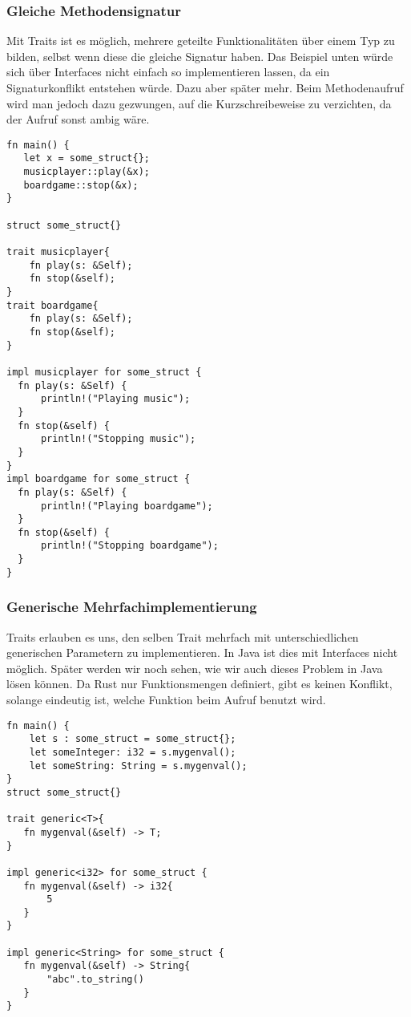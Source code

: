 \documentclass[a4paper, 1ppt]{article}
\begin{document}
\subsubsection{Gleiche Methodensignatur}
Mit Traits ist es möglich, mehrere geteilte Funktionalitäten über einem Typ zu bilden, selbst wenn diese die gleiche Signatur haben.
Das Beispiel unten würde sich über Interfaces nicht einfach so implementieren lassen, da ein Signaturkonflikt entstehen würde. Dazu aber später mehr.
Beim Methodenaufruf wird man jedoch dazu gezwungen, auf die Kurzschreibeweise zu verzichten, da der Aufruf sonst ambig wäre.
\begin{verbatim}
fn main() {
   let x = some_struct{};
   musicplayer::play(&x);
   boardgame::stop(&x);
}

struct some_struct{}

trait musicplayer{
    fn play(s: &Self);
    fn stop(&self);
}
trait boardgame{
    fn play(s: &Self);
    fn stop(&self);
}

impl musicplayer for some_struct {
  fn play(s: &Self) {
      println!("Playing music");
  }
  fn stop(&self) {
      println!("Stopping music");
  }
}
impl boardgame for some_struct {
  fn play(s: &Self) {
      println!("Playing boardgame");
  }
  fn stop(&self) {
      println!("Stopping boardgame");
  }
}
\end{verbatim}
\subsubsection{Generische Mehrfachimplementierung}
Traits erlauben es uns, den selben Trait mehrfach mit unterschiedlichen generischen Parametern zu implementieren.
In Java ist dies mit Interfaces nicht möglich. Später werden wir noch sehen, wie wir auch dieses Problem in Java lösen können.
Da Rust nur Funktionsmengen definiert, gibt es keinen Konflikt, solange eindeutig ist, welche Funktion beim Aufruf benutzt wird.
\begin{verbatim}
fn main() {
    let s : some_struct = some_struct{};
    let someInteger: i32 = s.mygenval();
    let someString: String = s.mygenval();
}
struct some_struct{}

trait generic<T>{
   fn mygenval(&self) -> T;
}

impl generic<i32> for some_struct {
   fn mygenval(&self) -> i32{
       5
   }
}

impl generic<String> for some_struct {
   fn mygenval(&self) -> String{
       "abc".to_string()
   }
}
\end{verbatim}
\end{document}
